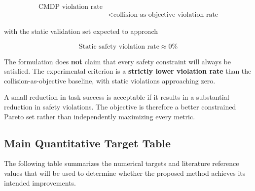 \documentclass[journal]{IEEEtran}
\begin{document}
\begin{equation}
\boxed{
\begin{aligned}
\text{CMDP violation rate}\\
&<\text{collision-as-objective violation rate}
\end{aligned}
}
\end{equation}

with the static validation set expected to approach

\begin{equation}
\boxed{
\text{Static safety violation rate}
\approx 0\%
}
\end{equation}

The formulation does \textbf{not} claim that every safety constraint
will always be satisfied. The experimental criterion is a
\textbf{strictly lower violation rate} than the collision-as-objective
baseline, with static violations approaching zero.

A small reduction in task success is acceptable if it results in a
substantial reduction in safety violations. The objective is therefore
a better constrained Pareto set rather than independently maximizing
every metric.


\subsection{Main Quantitative Target Table}

The following table summarizes the numerical targets and literature
reference values that will be used to determine whether the proposed
method achieves its intended improvements.
\end{document}
